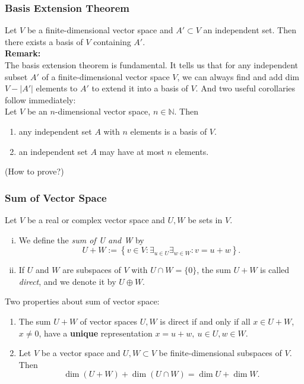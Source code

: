 \documentclass{beamer}
\renewcommand{\emph}[1]{{\color{Turquoise3}\textsl{#1}}}
\newcommand{\N}{\mathbb{N}}
\newcommand{\nullspace}{~\\[15pt]}
\newcommand{\remark}{\textbf{Remark:}}
\begin{document}
\begin{frame}
    \frametitle{Basis Extension Theorem}
    Let $V$ be a finite-dimensional vector space and $A'\subset V$ an independent set. Then there exists a basis of $V$ containing $A'$.
    \nullspace
    \remark\\
    The basis extension theorem is fundamental. It tells us that for any independent subset $A'$ of a finite-dimensional vector space $V$, we can always find and add dim $V-|A'|$ elements to $A'$ to extend it into a basis of $V$. And two useful corollaries follow immediately:\nullspace
    Let $V$ be an $n$-dimensional vector space, $n\in\N$. Then\\
    \begin{enumerate}
        \item any independent set $A$ with $n$ elements is a basis of $V$.
        \item an independent set $A$ may have at most $n$ elements.
    \end{enumerate}
    (How to prove?)
\end{frame}

\begin{frame}
    \frametitle{Sum of Vector Space}
    Let $V$ be a real or complex vector space and $U,W$ be sets in $V$.
    \begin{enumerate}[(i)]
        \item We define the \emph{sum of U and W} by
              \[U+W:=\left\{v\in V:\mathop{\exists}_{u\in U}\mathop{\exists}_{w\in W}: v=u+w\right\}.\]
        \item If $U$ and $W$ are subspaces of $V$ with $U\cap W=\{0\}$, the sum $U+W$ is called \emph{direct}, and we denote it by $U\oplus W$.
    \end{enumerate}
    Two properties about sum of vector space:\\
    \begin{enumerate}
        \item The sum $U+W$ of vector spaces $U,W$ is direct if and only if all $x\in U+W$, $x\neq0$, have a \textbf{unique} representation $x=u+w,~u\in U,w\in W$.
        \item Let $V$ be a vector space and $U,W\subset V$ be finite-dimensional subspaces of $V$. Then
        \[\dim(U+W)+\dim(U\cap W)=\dim U+\dim W.\]
    \end{enumerate}
\end{frame}
\end{document}
